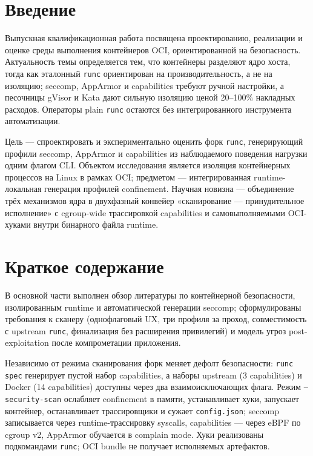 \documentclass[oneside,final,14pt,a4paper]{extreport}
\begin{document}

\tableofcontents
\newpage

\setcounter{page}{3}
\setcounter{section}{0}

\section{Введение}

Выпускная квалификационная работа посвящена проектированию, реализации и оценке среды выполнения контейнеров OCI, ориентированной на безопасность. Актуальность темы определяется тем, что контейнеры разделяют ядро хоста, тогда как эталонный \texttt{runc} ориентирован на производительность, а не на изоляцию; seccomp, AppArmor и capabilities требуют ручной настройки, а песочницы gVisor и Kata дают сильную изоляцию ценой 20--100\% накладных расходов. Операторы plain \texttt{runc} остаются без интегрированного инструмента автоматизации.

Цель --- спроектировать и экспериментально оценить форк \texttt{runc}, генерирующий профили seccomp, AppArmor и capabilities из наблюдаемого поведения нагрузки одним флагом CLI. Объектом исследования является изоляция контейнерных процессов на Linux в рамках OCI; предметом --- интегрированная runtime-локальная генерация профилей confinement. Научная новизна --- объединение трёх механизмов ядра в двухфазный конвейер «сканирование --- принудительное исполнение» с cgroup-wide трассировкой capabilities и самовыполняемыми OCI-хуками внутри бинарного файла runtime.

\section{Краткое содержание}

В основной части выполнен обзор литературы по контейнерной безопасности, изолированным runtime и автоматической генерации seccomp; сформулированы требования к сканеру (однофлаговый UX, три профиля за проход, совместимость с upstream \texttt{runc}, финализация без расширения привилегий) и модель угроз post-exploitation после компрометации приложения.

Независимо от режима сканирования форк меняет дефолт безопасности: \texttt{runc spec} генерирует пустой набор capabilities, а наборы upstream (3 capabilities) и Docker (14 capabilities) доступны через два взаимоисключающих флага. Режим \texttt{--security-scan} ослабляет confinement в памяти, устанавливает хуки, запускает контейнер, останавливает трассировщики и сужает \texttt{config.json}; seccomp записывается через runtime-трассировку syscalls, capabilities --- через eBPF по cgroup v2, AppArmor обучается в complain mode. Хуки реализованы подкомандами \texttt{runc}; OCI bundle не получает исполняемых артефактов.
\end{document}

